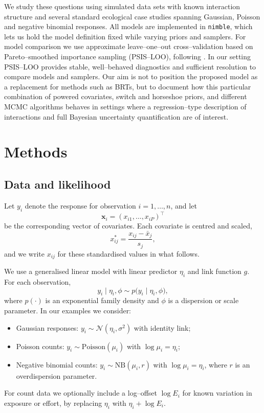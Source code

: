 \documentclass[11pt]{article}
\begin{document}
\begin{doublespacing}
\begin{linenumbers}
\begin{flushleft}
We study these questions using simulated data sets with known interaction structure and several standard ecological case studies spanning Gaussian, Poisson and negative binomial responses. All models are implemented in \texttt{nimble}, which lets us hold the model definition fixed while varying priors and samplers. For model comparison we use approximate leave–one–out cross–validation based on Pareto–smoothed importance sampling (PSIS–LOO), following \citet{2017_vehtari}. In our setting PSIS–LOO provides stable, well–behaved diagnostics and sufficient resolution to compare models and samplers. Our aim is not to position the proposed model as a replacement for methods such as BRTs, but to document how this particular combination of powered covariates, switch and horseshoe priors, and different MCMC algorithms behaves in settings where a regression–type description of interactions and full Bayesian uncertainty quantification are of interest.

\section{Methods}

\subsection{Data and likelihood}

Let $y_i$ denote the response for observation $i = 1,\dots,n$, and let
\[
  \mathbf{x}_i = (x_{i1},\dots,x_{iP})^\top
\]
be the corresponding vector of covariates. Each covariate is centred and scaled,
\[
  x_{ij}^{\ast} = \frac{x_{ij} - \bar{x}_j}{s_j},
\]
and we write $x_{ij}$ for these standardised values in what follows.

We use a generalised linear model with linear predictor $\eta_i$ and link function $g$. For each observation,
\[
  y_i \mid \eta_i,\phi \sim p\bigl(y_i \mid \eta_i,\phi\bigr),
\]
where $p(\cdot)$ is an exponential family density and $\phi$ is a dispersion or scale parameter. In our examples we consider:
\begin{itemize}
  \item Gaussian responses: $y_i \sim \mathcal{N}(\eta_i,\sigma^2)$ with identity link;
  \item Poisson counts: $y_i \sim \mathrm{Poisson}(\mu_i)$ with $\log \mu_i = \eta_i$;
  \item Negative binomial counts: $y_i \sim \mathrm{NB}(\mu_i,r)$ with $\log \mu_i = \eta_i$, where $r$ is an overdispersion parameter.
\end{itemize}
For count data we optionally include a log–offset $\log E_i$ for known variation in exposure or effort, by replacing $\eta_i$ with $\eta_i + \log E_i$.


\end{flushleft}
\end{linenumbers}
\end{doublespacing}
\end{document}

